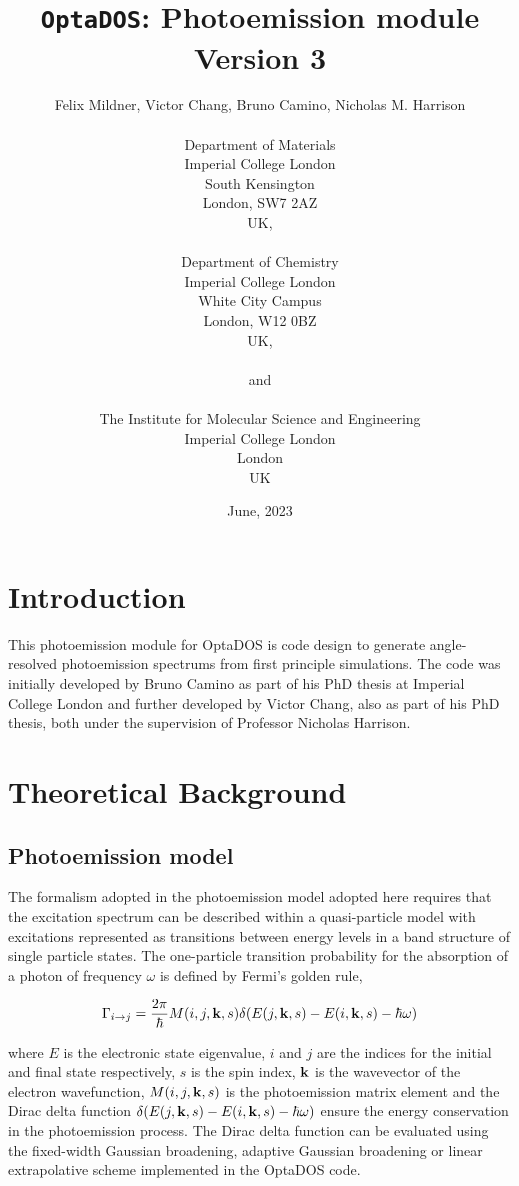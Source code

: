 \documentclass[a4paper,11pt,twoside]{book}
\title{{\huge {\tt OptaDOS}: Photoemission module}\\ {Version 3}}
\author{Felix Mildner, Victor Chang, Bruno Camino, Nicholas M. Harrison \\
\\
Department of Materials\\
Imperial College London\\
South Kensington\\
London, SW7 2AZ\\
UK,\\
\\
Department of Chemistry\\
Imperial College London\\
White City Campus\\
London, W12 0BZ\\
UK,\\
\\
{\small and} \\
\\
The Institute for Molecular Science and Engineering\\
Imperial College London\\
London\\
UK}
\date{June, 2023}
\begin{document}
\newcommand{\optados}{\textsc{OptaDOS}}
\newcommand{\lindos}{\texttt{LinDOS}}
\newcommand{\onetep}{\textsc{onetep}}
\newcommand{\castep}{\textsc{castep}}
\maketitle

 \thispagestyle{empty}







\chapter{Introduction}\label{chap:introduction}

This photoemission module for OptaDOS is code design to generate angle-resolved photoemission spectrums from first principle simulations. The code was initially developed by Bruno Camino as part of his PhD thesis at Imperial College London and further developed by Victor Chang, also as part of his PhD thesis, both under the supervision of Professor Nicholas Harrison.


\chapter{Theoretical Background} \label{sec:theory}

\section{Photoemission model}

The formalism adopted in the photoemission model adopted here requires that the excitation spectrum can be described within a quasi-particle model with excitations represented as transitions between energy levels in a  band structure of single particle states. The one-particle transition probability for the absorption of a photon of frequency $\omega$ is defined by Fermi's golden rule,

\begin{equation}
\Gamma_{i \rightarrow j} = \frac{2 \pi}{\hbar} M (i,j,{\bf{k}},s  ) \delta(E{(j,{\bf{k}},s)}-E{(i,{\bf{k}},s)}-\hbar \omega  )
    \label{fermi_golden_rule}
\end{equation}

where $E$ is the electronic state eigenvalue, $i$ and $j$ are the indices for the initial and final state respectively, $s$ is the spin index, $\bf{k}$ is the wavevector of the electron wavefunction, $M(i,j,{\bf{k}},s)$ is the photoemission matrix element and the Dirac delta function $\delta(E{(j,{\bf{k}},s)}-E{(i,{\bf{k}},s)}-\hbar \omega)$ ensure the energy conservation in the photoemission process. The Dirac delta function can be evaluated using the fixed-width Gaussian broadening, adaptive Gaussian broadening or linear extrapolative scheme implemented in the OptaDOS code. 
\end{document}

